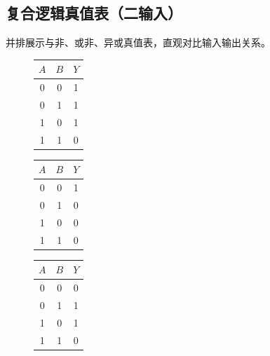 \subsection{复合逻辑真值表（二输入）}
并排展示与非、或非、异或真值表，直观对比输入输出关系。
\begin{figure}[!htbp]
    \centering
    \begin{minipage}{0.32\textwidth}
        \centering
        \begin{tabular}{|c|c|c|}
            \hline
            $A$ & $B$ & $Y$ \\
            \hline
            0&0&1\\0&1&1\\1&0&1\\1&1&0\\
            \hline
        \end{tabular}
    \end{minipage}
    \hfill
    \begin{minipage}{0.32\textwidth}
        \centering
        \begin{tabular}{|c|c|c|}
            \hline
            $A$ & $B$ & $Y$ \\
            \hline
            0&0&1\\0&1&0\\1&0&0\\1&1&0\\
            \hline
        \end{tabular}
    \end{minipage}
    \hfill
    \begin{minipage}{0.32\textwidth}
        \centering
        \begin{tabular}{|c|c|c|}
            \hline
            $A$ & $B$ & $Y$ \\
            \hline
            0&0&0\\0&1&1\\1&0&1\\1&1&0\\
            \hline
        \end{tabular}
    \end{minipage}
\end{figure}

